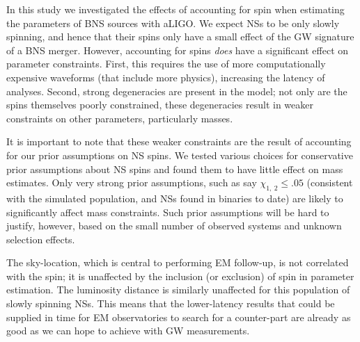 In this study we investigated the effects of accounting for spin when estimating the parameters of BNS sources with aLIGO. We expect NSs to be only slowly spinning, and hence that their spins only have a small effect of the GW signature of a BNS merger. However, accounting for spins \emph{does} have a significant effect on parameter constraints. First, this requires the use of more computationally expensive waveforms (that include more physics), increasing the latency of analyses. Second, strong degeneracies are present in the model; not only are the spins themselves poorly constrained, these degeneracies result in weaker constraints on other parameters, particularly masses.

It is important to note that these weaker constraints are the result of accounting for our prior assumptions on NS spins.  We tested various choices for conservative prior assumptions about NS spins and found them to have little effect on mass estimates.  Only very strong prior assumptions, such as say $\chi_{1,~2}\leq .05$ (consistent with the simulated population, and NSs found in binaries to date) are likely to significantly affect mass constraints.  Such prior assumptions will be hard to justify, however, based on the small number of observed systems and unknown selection effects. 

The sky-location, which is central to performing EM follow-up, is not correlated with the spin; it is unaffected by the inclusion (or exclusion) of spin in parameter estimation. The luminosity distance is similarly unaffected for this population of slowly spinning NSs. This means that the lower-latency results that could be supplied in time for EM observatories to search for a counter-part are already as good as we can hope to achieve with GW measurements.
  